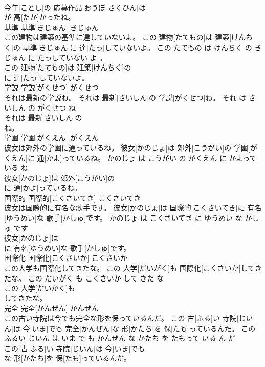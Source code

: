 \documentclass[8pt]{extreport}
\begin{document}
\begin{CJK}{UTF8}{min}
\\	今年[ことし]の 応募作品[おうぼ さくひん]は
\\	が 高[たか]かったね。			
\\	基準	基準[きじゅん]	きじゅん	
\\	この建物は建築の基準に達していないよ。	この 建物[たてもの]は 建築[けんちく]の 基準[きじゅん]に 達[たっ]していないよ。	この たてもの は けんちく の きじゅん に たっしていない よ 。	
\\	この 建物[たてもの]は 建築[けんちく]の
\\	に 達[たっ]していないよ。			
\\	学説	学説[がくせつ]	がくせつ	
\\	それは最新の学説ね。	それは 最新[さいしん]の 学説[がくせつ]ね。	それ は さいしん の がくせつ ね	
\\	それは 最新[さいしん]の
\\	ね。			
\\	学園	学園[がくえん]	がくえん	
\\	彼女は郊外の学園に通っているね。	彼女[かのじょ]は 郊外[こうがい]の 学園[がくえん]に 通[かよ]っているね。	かのじょ は こうがい の がくえん に かよって いる ね	
\\	彼女[かのじょ]は 郊外[こうがい]の
\\	に 通[かよ]っているね。			
\\	国際的	国際的[こくさいてき]	こくさいてき	
\\	彼女は国際的に有名な歌手です。	彼女[かのじょ]は 国際的[こくさいてき]に 有名[ゆうめい]な 歌手[かしゅ]です。	かのじょ は こくさいてき に ゆうめい な かしゅ です	
\\	彼女[かのじょ]は
\\	に 有名[ゆうめい]な 歌手[かしゅ]です。			
\\	国際化	国際化[こくさいか]	こくさいか	
\\	この大学も国際化してきたな。	この 大学[だいがく]も 国際化[こくさいか]してきたな。	この だいがく も こくさいか して きた な	
\\	この 大学[だいがく]も
\\	してきたな。			
\\	完全	完全[かんぜん]	かんぜん	
\\	この古い寺院は今でも完全な形を保っているんだ。	この 古[ふる]い 寺院[じいん]は 今[いま]でも 完全[かんぜん]な 形[かたち]を 保[たも]っているんだ。	この ふるい じいん は いま で も かんぜん な かたち を たもって いる ん だ	
\\	この 古[ふる]い 寺院[じいん]は 今[いま]でも
\\	な 形[かたち]を 保[たも]っているんだ。			

\end{CJK}
\end{document}
